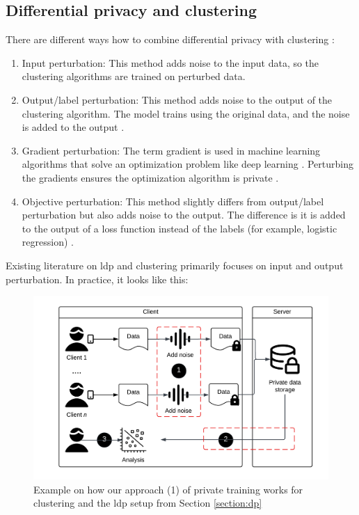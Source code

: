 \subsection{Differential privacy and clustering} \label{theory:literature-review:dp-clustering}
There are different ways how to combine differential privacy with clustering \citep{baraheem_survey_2022}:
\begin{enumerate}
  \item Input perturbation: This method adds noise to the input data, so the clustering algorithms are trained on perturbed data.
  \item Output/label perturbation: This method adds noise to the output of the clustering algorithm.
        The model trains using the original data, and the noise is added to the output \citep{ji_differential_2014}.
        \item Gradient perturbation: The term gradient is used in machine learning algorithms that solve an optimization problem like deep learning \citep{hassan_differential_2019}.
        Perturbing the gradients ensures the optimization algorithm is private \citep{ji_differential_2014}.
  \item Objective perturbation: This method slightly differs from output/label perturbation but also adds noise to the output.
        The difference is it is added to the output of a loss function instead of the labels (for example, logistic regression) \citep{baraheem_survey_2022}.
\end{enumerate}
Existing literature on \gls{ldp} and clustering primarily focuses on input and output perturbation. 
In practice, it looks like this:
\begin{figure}[H]
\centering
  \includegraphics[width=1\linewidth]{TheorethicalFramework//ND-Laplace//Images/Thesis-nd - Page 7.png}
 \caption{Example on how our approach (1) of private training works for clustering and the \gls{ldp} setup from Section \ref{section:dp}}
  \label{fig:overview-clustering-and-dp}
\end{figure}
